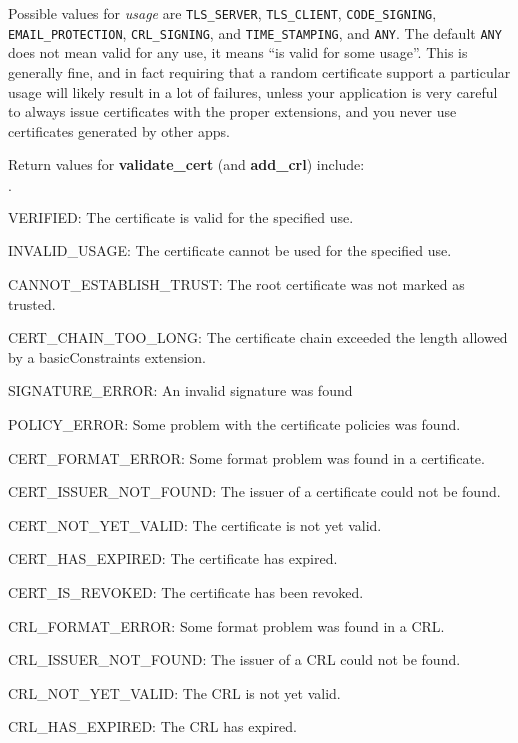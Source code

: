 \documentclass{article}
\newcommand{\function}[1]{\textbf{#1}}
\newcommand{\type}[1]{\texttt{#1}}
\renewcommand{\arg}[1]{\textsl{#1}}
\begin{document}
Possible values for \arg{usage} are \type{TLS\_SERVER}, \type{TLS\_CLIENT},
\type{CODE\_SIGNING}, \type{EMAIL\_PROTECTION}, \type{CRL\_SIGNING}, and
\type{TIME\_STAMPING}, and \type{ANY}. The default \type{ANY} does not mean
valid for any use, it means ``is valid for some usage''. This is generally
fine, and in fact requiring that a random certificate support a particular
usage will likely result in a lot of failures, unless your application is very
careful to always issue certificates with the proper extensions, and you never
use certificates generated by other apps.

Return values for \function{validate\_cert} (and \function{add\_crl}) include:

\begin{list}{$\cdot$}
  \item VERIFIED: The certificate is valid for the specified use.
  \item
  \item INVALID\_USAGE: The certificate cannot be used for the specified use.

   \item CANNOT\_ESTABLISH\_TRUST: The root certificate was not marked as
         trusted.
   \item CERT\_CHAIN\_TOO\_LONG: The certificate chain exceeded the length
         allowed by a basicConstraints extension.
   \item SIGNATURE\_ERROR: An invalid signature was found
   \item POLICY\_ERROR: Some problem with the certificate policies was found.

   \item CERT\_FORMAT\_ERROR: Some format problem was found in a certificate.
   \item CERT\_ISSUER\_NOT\_FOUND: The issuer of a certificate could not be
         found.
   \item CERT\_NOT\_YET\_VALID: The certificate is not yet valid.
   \item CERT\_HAS\_EXPIRED: The certificate has expired.
   \item CERT\_IS\_REVOKED: The certificate has been revoked.

   \item CRL\_FORMAT\_ERROR: Some format problem was found in a CRL.
   \item CRL\_ISSUER\_NOT\_FOUND: The issuer of a CRL could not be found.
   \item CRL\_NOT\_YET\_VALID: The CRL is not yet valid.
   \item CRL\_HAS\_EXPIRED: The CRL has expired.


\end{list}
\end{document}
